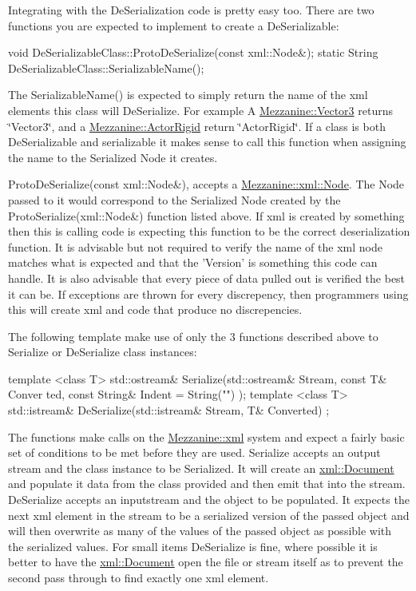  \par
 Integrating with the DeSerialization code is pretty easy too. There are two functions you are expected to implement to create a DeSerializable: 
\begin{DoxyCode}
 void DeSerializableClass::ProtoDeSerialize(const xml::Node&);
 static String DeSerializableClass::SerializableName();
\end{DoxyCode}
 The SerializableName() is expected to simply return the name of the xml elements this class will DeSerialize. For example A \hyperlink{classMezzanine_1_1Vector3}{Mezzanine::Vector3} returns \char`\"{}Vector3\char`\"{}, and a \hyperlink{classMezzanine_1_1ActorRigid}{Mezzanine::ActorRigid} return \char`\"{}ActorRigid\char`\"{}. If a class is both DeSerializable and serializable it makes sense to call this function when assigning the name to the Serialized Node it creates. \par
 \par
 ProtoDeSerialize(const xml::Node\&), accepts a \hyperlink{classMezzanine_1_1xml_1_1Node}{Mezzanine::xml::Node}. The Node passed to it would correspond to the Serialized Node created by the ProtoSerialize(xml::Node\&) function listed above. If xml is created by something then this is calling code is expecting this function to be the correct deserialization function. It is advisable but not required to verify the name of the xml node matches what is expected and that the 'Version' is something this code can handle. It is also advisable that every piece of data pulled out is verified the best it can be. If exceptions are thrown for every discrepency, then programmers using this will create xml and code that produce no discrepencies. \par
 \par
 The following template make use of only the 3 functions described above to Serialize or DeSerialize class instances: 
\begin{DoxyCode}
 template <class T> std::ostream& Serialize(std::ostream& Stream, const T& Conver
      ted, const String& Indent = String("") );
 template <class T> std::istream& DeSerialize(std::istream& Stream, T& Converted)
      ;
\end{DoxyCode}
 The functions make calls on the \hyperlink{namespaceMezzanine_1_1xml}{Mezzanine::xml} system and expect a fairly basic set of conditions to be met before they are used. Serialize accepts an output stream and the class instance to be Serialized. It will create an \hyperlink{classMezzanine_1_1xml_1_1Document}{xml::Document} and populate it data from the class provided and then emit that into the stream. DeSerialize accepts an inputstream and the object to be populated. It expects the next xml element in the stream to be a serialized version of the passed object and will then overwrite as many of the values of the passed object as possible with the serialized values. For small items DeSerialize is fine, where possible it is better to have the \hyperlink{classMezzanine_1_1xml_1_1Document}{xml::Document} open the file or stream itself as to prevent the second pass through to find exactly one xml element. \par
